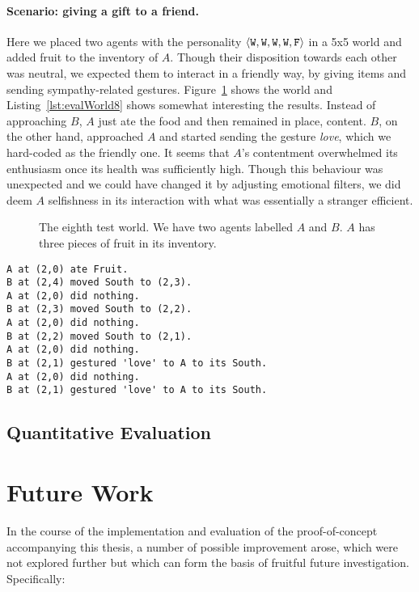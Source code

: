 \paragraph{Scenario: giving a gift to a friend.} Here we placed two agents with the personality $\langle \mathtt{W},\mathtt{W}, \mathtt{W}, \mathtt{W}, \mathtt{F} \rangle$ in a 5x5 world and added fruit to the inventory of $A$. Though their disposition towards each other was neutral, we expected them to interact in a friendly way, by giving items and sending sympathy-related gestures. Figure~\ref{fig:evalWorld8} shows the world and Listing~\ref{lst:evalWorld8} shows somewhat interesting the results. Instead of approaching $B$, $A$ just ate the food and then remained in place, content. $B$, on the other hand, approached $A$ and started sending the gesture \emph{love}, which we hard-coded as the friendly one. It seems that $A$'s contentment overwhelmed its enthusiasm once its health was sufficiently high. Though this behaviour was unexpected and we could have changed it by adjusting emotional filters, we did deem $A$ selfishness in its interaction with what was essentially a stranger efficient.

\begin{figure}
    \centering
    
    \caption{The eighth test world. We have two agents labelled $A$ and $B$. $A$ has three pieces of fruit in its inventory.}
    \label{fig:evalWorld8}
\end{figure}

\begin{lstlisting}[caption=Actions in the scenario ``giving a gift to a friend''., label=lst:evalWorld8]
A at (2,0) ate Fruit.
B at (2,4) moved South to (2,3).
A at (2,0) did nothing.
B at (2,3) moved South to (2,2).
A at (2,0) did nothing.
B at (2,2) moved South to (2,1).
A at (2,0) did nothing.
B at (2,1) gestured 'love' to A to its South.
A at (2,0) did nothing.
B at (2,1) gestured 'love' to A to its South.
\end{lstlisting}

\subsection{Quantitative Evaluation}

\section{Future Work}\label{sec:futureWork}

In the course of the implementation and evaluation of the proof-of-concept accompanying this thesis, a number of possible improvement arose, which were not explored further but which can form the basis of fruitful future investigation. Specifically:

